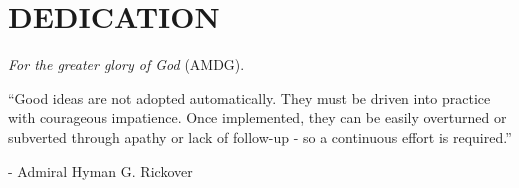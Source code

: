 %
%
%

\chapter*{DEDICATION}

\begin{center}
\vspace{60 mm}
{\em For the greater glory of God} (AMDG).

\vspace{80 mm}
``Good ideas are not adopted automatically. They must be driven into practice with courageous impatience. Once implemented, they can be easily overturned or subverted through apathy or lack of follow-up - so a continuous effort is required.''

- Admiral Hyman G. Rickover

\end{center}
\pagebreak{}
